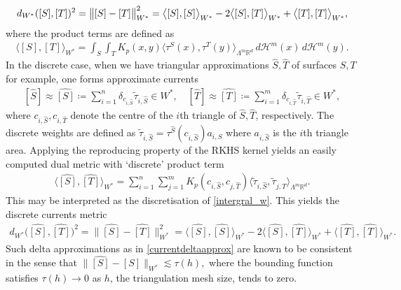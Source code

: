 \documentclass[sn-mathphys-num]{sn-jnl}%
\theoremstyle{thmstyleone}%
\theoremstyle{thmstyletwo}%
\theoremstyle{thmstylethree}%
\numberwithin{remark}{section}
\numberwithin{definition}{section}
\numberwithin{equation}{section}
\numberwithin{theorem}{section}
\newcommand{\norm}[1]{\left\lVert#1\right\rVert}
\newcommand{\R}{\ensuremath{\mathbb{R}}}%
\begin{document}
\begin{align}\label{dualmet_w}
    d_{W^{*}}([S],[T])^{2} = \norm{\vphantom{\big|}[S]-[T]}_{W^{*}}^{2} = \bigl\langle [S],[S] \bigr\rangle_{W^{*}} -2\bigl\langle [S],[T] \bigr\rangle_{W^{*}} + \bigl\langle [T],[T] \bigr\rangle_{W^{*}},
\end{align}
where the product terms are defined as
\begin{align}\label{intergral_w}
    \bigl\langle [S],[T] \bigr\rangle_{W^{*}} =  \int_{S}\int_{T}{K_{p}(x,y)\langle \tau^{S}(x),\tau^{T}(y) \rangle_{\Lambda^{m}\R^{d} }\,d\mathcal{H}^{m}(x) \,d\mathcal{H}^{m}(y)}.
\end{align}
In the discrete case, when we have triangular approximations $\hat{S},\hat{T}$ of  surfaces $S,T$ for example, one forms approximate currents
\begin{align}\label{currentdeltaapprox}
    [\hat{S}] \approx \widehat{[S]} \coloneq \sum_{i=1}^{n}{\delta_{c_{i,\hat{S}} }\tilde{\tau}_{i,\hat{S}} } \in W^{*}, \quad
    [\hat{T}] \approx \widehat{[T]} \coloneq \sum_{i=1}^{m}{\delta_{c_{i,\hat{T}}}\tilde{\tau}_{i,\hat{T}}  } \in W^{*},
\end{align}  
where $c_{i,\hat{S}},c_{i,\hat{T}}$ denote the centre of the $i$th triangle of $\hat{S},\hat{T}$, respectively. The discrete weights are defined as $\tilde{\tau}_{i,\hat{S}}={\tau}^{\hat{S}}(c_{i,\hat{S}})a_{i,S}$ where $a_{i,\hat{S}}$ is the $i$th triangle area. Applying the reproducing property of the RKHS kernel yields an easily computed dual metric  with `discrete' product term
\begin{align}\label{discinnerprodcurr}
    \big\langle \widehat{[S]},\widehat{[T]}\big\rangle_{W^{*}} = \sum_{i=1}^{n}\sum_{j=1}^{m}{K_{p}(c_{i,\hat{S}},c_{j,\hat{T}} )\langle \tilde{\tau}_{i,\hat{S}},\tilde{\tau}_{j,\hat{T}} \rangle_{\Lambda^{m}\R^{d}} }.
\end{align}
This may be interpreted as the discretisation of \cref{intergral_w}. This yields the discrete currents metric
\begin{align*}
    d_{W^{*}}\bigl(\widehat{[S]},\widehat{[T]}\bigr)^{2} 
    = \bigl\|{\widehat{[S]}-\widehat{[T]}}\bigr\|^2_{W^{*}} = \bigl\langle \widehat{[S]},\widehat{[S]} \bigr\rangle_{W^{*}} -2\bigl\langle \widehat{[S]},\widehat{[T]} \bigr\rangle_{W^{*}} + \bigl\langle \widehat{[T]},\widehat{[T]} \bigr\rangle_{W^{*}}.
\end{align*}
Such delta approximations as in \cref{currentdeltaapprox} are known to be consistent \cite{FidelityMetrics} in the sense that
$    \bigl\|{\widehat{[S]} -  [S]  }\bigr\|_{W^{*}} \lesssim \tau(h),
$ 
where the bounding function satisfies $\tau(h) \to 0$ as $h$, the triangulation mesh size, tends to zero.
\end{document}
